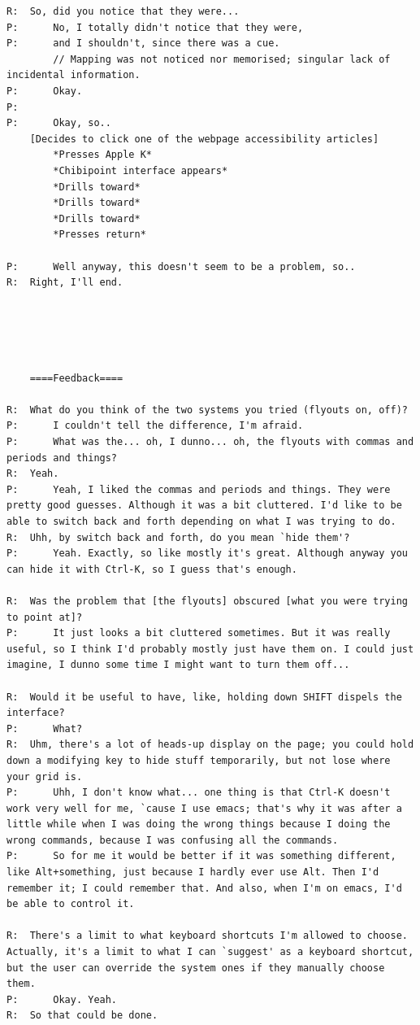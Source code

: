 \documentclass[11pt,openright,a4paper]{report}
\begin{document}
\begin{lstlisting}[caption={Transcript of Usability Study}, label={lst:usabilityTrans}, style=basic, language=custom, flexiblecolumns=true]
R:	So, did you notice that they were...
P:		No, I totally didn't notice that they were,
P:		and I shouldn't, since there was a cue.
		// Mapping was not noticed nor memorised; singular lack of incidental information.
P:		Okay.
P:		
P:		Okay, so..
	[Decides to click one of the webpage accessibility articles]
		*Presses Apple K*
		*Chibipoint interface appears*
		*Drills toward*
		*Drills toward*
		*Drills toward*
		*Presses return*

P:		Well anyway, this doesn't seem to be a problem, so..
R:	Right, I'll end.





	====Feedback====

R:	What do you think of the two systems you tried (flyouts on, off)?
P:		I couldn't tell the difference, I'm afraid.
P:		What was the... oh, I dunno... oh, the flyouts with commas and periods and things?
R:	Yeah.
P:		Yeah, I liked the commas and periods and things. They were pretty good guesses. Although it was a bit cluttered. I'd like to be able to switch back and forth depending on what I was trying to do.
R:	Uhh, by switch back and forth, do you mean `hide them'?
P:		Yeah. Exactly, so like mostly it's great. Although anyway you can hide it with Ctrl-K, so I guess that's enough.

R:	Was the problem that [the flyouts] obscured [what you were trying to point at]?
P:		It just looks a bit cluttered sometimes. But it was really useful, so I think I'd probably mostly just have them on. I could just imagine, I dunno some time I might want to turn them off...

R:	Would it be useful to have, like, holding down SHIFT dispels the interface?
P:		What?
R:	Uhm, there's a lot of heads-up display on the page; you could hold down a modifying key to hide stuff temporarily, but not lose where your grid is.
P:		Uhh, I don't know what... one thing is that Ctrl-K doesn't work very well for me, `cause I use emacs; that's why it was after a little while when I was doing the wrong things because I doing the wrong commands, because I was confusing all the commands.
P:		So for me it would be better if it was something different, like Alt+something, just because I hardly ever use Alt. Then I'd remember it; I could remember that. And also, when I'm on emacs, I'd be able to control it.

R:	There's a limit to what keyboard shortcuts I'm allowed to choose. Actually, it's a limit to what I can `suggest' as a keyboard shortcut, but the user can override the system ones if they manually choose them.
P:		Okay. Yeah.
R:	So that could be done.


\end{lstlisting}
\end{document}
